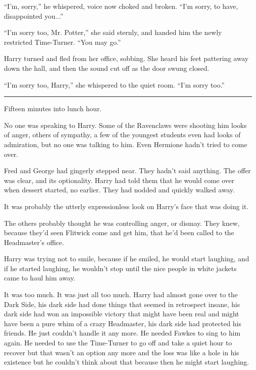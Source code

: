 ``I'm, sorry,'' he whispered, voice now choked and broken. ``I'm sorry, to have, disappointed you...''

``I'm sorry too, Mr. Potter,'' she said sternly, and handed him the newly restricted Time-Turner. ``You may go.''

Harry turned and fled from her office, sobbing. She heard his feet pattering away down the hall, and then the sound cut off as the door swung closed.

``I'm sorry too, Harry,'' she whispered to the quiet room. ``I'm sorry too.''

\begin{center}\rule{3in}{0.4pt}\end{center}

Fifteen minutes into lunch hour.

No one was speaking to Harry. Some of the Ravenclaws were shooting him looks of anger, others of sympathy, a few of the youngest students even had looks of admiration, but no one was talking to him. Even Hermione hadn't tried to come over.

Fred and George had gingerly stepped near. They hadn't said anything. The offer was clear, and its optionality. Harry had told them that he would come over when dessert started, no earlier. They had nodded and quickly walked away.

It was probably the utterly expressionless look on Harry's face that was doing it.

The others probably thought he was controlling anger, or dismay. They knew, because they'd seen Flitwick come and get him, that he'd been called to the Headmaster's office.

Harry was trying not to smile, because if he smiled, he would start laughing, and if he started laughing, he wouldn't stop until the nice people in white jackets came to haul him away.

It was too much. It was just all too much. Harry had almost gone over to the Dark Side, his dark side had done things that seemed in retrospect insane, his dark side had won an impossible victory that might have been real and might have been a pure whim of a crazy Headmaster, his dark side had protected his friends. He just couldn't handle it any more. He needed Fawkes to sing to him again. He needed to use the Time-Turner to go off and take a quiet hour to recover but that wasn't an option any more and the loss was like a hole in his existence but he couldn't think about that because then he might start laughing.

